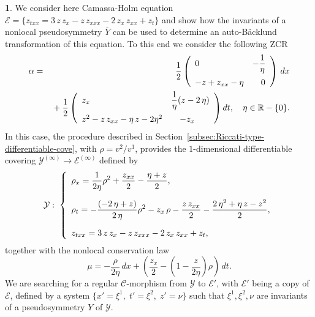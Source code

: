 \documentclass[12pt,english]{elsarticle}
\theoremstyle{plain}
\theoremstyle{plain}
\theoremstyle{remark}
\theoremstyle{plain}
\theoremstyle{definition}
\theoremstyle{definition}
\newtheorem{example}[thm]{\protect\examplename}
\providecommand{\examplename}{Example}
\begin{document}
\begin{example}
\label{exmp31}
We consider here Camassa-Holm equation
$\mathcal{E}=\{z_{txx}=3\,z\,z_{x}-z\,z_{xxx}-2\,z_{x}\,z_{xx}+z_{t}
\}$ and show how the invariants of a nonlocal pseudosymmetry
$\bar{Y}$ can be used to determine an auto-B\"{a}cklund transformation
of this equation. To this end we consider the following ZCR
%
\begin{eqnarray*}
%
\alpha &=&{\displaystyle \frac{1}{2}}\left (
%
\begin{array}{l@{\quad}l}
0
\vspace{5pt}
& -{\displaystyle \frac{1}{\eta}}
\\
-z+z_{xx}-\eta & \quad 0
\end{array}
%
\right )\,dx\\
&&{}+{\displaystyle \frac{1}{2}}\left (
%
\begin{array}{l@{\quad}l}
z_{x}
\vspace{5pt}
& {\displaystyle \frac{1}{\eta}}(z-2\,\eta )
\\
z^{2}-z\,z_{xx}-\eta \,z-2\eta ^{2} & \quad -z_{x}
\end{array}
%
\right )dt,\quad  {\eta \in \mathbb{R}-\{0\}.}%
%
\end{eqnarray*}
%
In this case, the procedure described in Section~\ref{subsec:Riccati-type-differentiable-cove}, with
$\rho =v^{2}/v^{1}$, provides the $1$-dimensional differentiable covering
$\mathcal{Y}^{(\infty )}\rightarrow \mathcal{E}^{(\infty )}$ defined by
%
\begin{equation}
\mathcal{Y}:\;\left \{ {\displaystyle
%
\begin{array}{l}
\rho _{x}={\displaystyle \frac{1}{2\eta}\rho ^{2}+\frac{z_{xx}}{2}-
\frac{\eta+z}{2}},
\vspace{10pt}
\\
\rho _{t}={\displaystyle -\frac{\left (-2\,\eta +z\right )}{2\,\eta}
\rho ^{2}-z_{x}\,\rho -\frac{z\,z_{xx}}{2}-
\frac{2\,\eta ^{2}+\eta \, z-z^{2}}{2}},
\vspace{10pt}
\\
z_{txx}=3\,z\,z_{x}-z\,z_{xxx}-2\,z_{x}\,z_{xx}+z_{t},
\end{array}
%
}\right .
\label{eq:Riccati-CH}
\end{equation}
%
together with the nonlocal conservation law
%
\begin{equation}
\mu =-\frac{\rho}{2\eta}\,dx+\left (\frac{z_{x}}{2}-\left (1-
\frac{z}{2\eta}\right )\rho \right )\,dt.
\label{eq:CL_CH}
\end{equation}
%
We are searching for a regular $\mathcal{C}$-morphism from
$\mathcal{Y}$ to $\mathcal{E}'$, with $\mathcal{E}'$ being a copy of
$\mathcal{E}$, defined by a system
$\{x'=\xi ^{1},\;t'=\xi ^{2},\;z'=\nu \}$ such that
$\xi ^{1},\xi ^{2},\nu $ are invariants of a pseudosymmetry $Y$ of
$\mathcal{Y}$.


\end{example}
\end{document}
